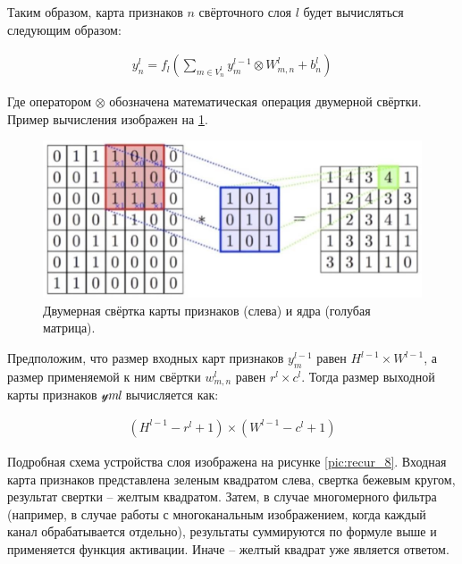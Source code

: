 \begin{itemize}
\begin{itemize}
Таким образом, карта признаков $n$ свёрточного слоя $l$ будет вычисляться следующим образом:

\begin{equation}
  \begin{gathered}
    y_n^l = f_l (\sum_{m \in {V_n^l}} y_m^{l-1} \otimes W_{m,n}^l + b_n^l)
  \end{gathered}
  \label{eq:speach_formula_7}
\end{equation}

Где оператором $\otimes$ обозначена математическая операция двумерной свёртки. Пример вычисления изображен на \ref{pic:recur_7}.

\begin{figure}[h]
\includegraphics[width=0.75\columnwidth]{./img/recur_7.jpg}
\centering
\caption{Двумерная свёртка карты признаков (слева) и ядра (голубая матрица). \cite{7_recur}}
\label{pic:recur_7}
\end{figure}

Предположим, что размер входных карт признаков $y_m^{l-1}$ равен $H^{l-1} \times W^{l-1}$, 
а размер применяемой к ним свёртки $w_{m,n}^l$ равен $r^l \times c^l$. Тогда размер выходной карты признаков 𝓎𝑚𝑙 вычисляется как:

\begin{equation}
  \begin{gathered}
    (H^{l-1} - r^l + 1) \times (W^{l-1} - c^l + 1)
  \end{gathered}
  \label{eq:speach_formula_8}
\end{equation}

Подробная схема устройства слоя изображена на рисунке \ref{pic:recur_8}. 
Входная карта признаков представлена зеленым квадратом слева, свертка бежевым кругом, 
результат свертки – желтым квадратом. Затем, в случае многомерного фильтра 
(например, в случае работы с многоканальным изображением, когда каждый канал обрабатывается отдельно), 
результаты суммируются по формуле выше и применяется функция активации.
Иначе – желтый квадрат уже является ответом.


\end{itemize}
\end{itemize}
